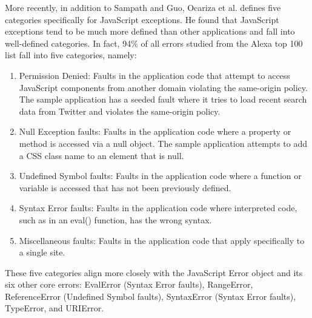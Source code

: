 More recently, in addition to Sampath and Guo, Ocariza et al. \cite{ocariza2011javascript} defines five categories specifically for JavaScript exceptions.  He found that JavaScript exceptions tend to be much more defined than other applications and fall into well-defined categories.  In fact, 94\% of all errors studied from the Alexa top 100 list fall into five categories, namely:

\begin{enumerate}
\item Permission Denied:  Faults in the application code that attempt to access JavaScript components from another domain violating the same-origin policy.  The sample application has a seeded fault where it tries to load recent search data from Twitter and violates the same-origin policy. 

\item Null Exception faults: Faults in the application code where a property or method is accessed via a null object.  The sample application attempts to add a CSS class name to an element that is null.

\item Undefined Symbol faults: Faults in the application code where a function or variable is accessed that has not been previously defined.

\item Syntax Error faults: Faults in the application code where interpreted code, such as in an eval() function, has the wrong syntax.

\item Miscellaneous faults: Faults in the application code that apply specifically to a single site.
\end{enumerate}

These five categories align more closely with the JavaScript Error object and its six other core errors: EvalError (Syntax Error faults), RangeError, ReferenceError (Undefined Symbol faults), SyntaxError (Syntax Error faults), TypeError, and URIError\cite{mdnError}.


